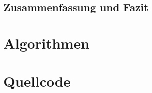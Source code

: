 \documentclass[a4paper,12pt,oneside,german,toc=bibliography]{scrbook}
\theoremstyle{definition}
\theoremstyle{plain}
\numberwithin{equation}{section}
\begin{document}
\section{Zusammenfassung und Fazit}




\appendix


\chapter{Algorithmen}






\chapter{Quellcode}






\end{document}
